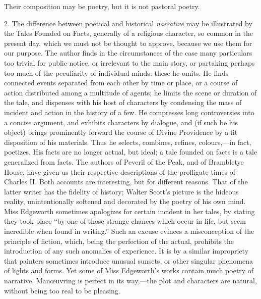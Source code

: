 Their composition may be poetry, but it is not pastoral poetry.

2. The difference between poetical and historical \emph{narrative}
may be illustrated by the Tales Founded on Facts, generally of a
religious character, so common in the present day, which we must not
be thought to approve, because we use them for our purpose. The author
finds in the circumstances of the case many particulars too trivial
for public notice, or irrelevant to the main story, or partaking
perhaps too much of the peculiarity of individual minds: these he
omits. He finds connected events separated from each other by time or
place, or a course of action distributed among a multitude of agents;
he limits the scene or duration of the tale, and dispenses with his
host of characters by condensing the mass of incident and action in
the history of a few. He compresses long controversies into a concise
argument, and exhibits characters by dialogue, and (if such be his
object) brings prominently forward the course of Divine Providence by
a fit disposition of his materials. Thus he selects, combines,
refines, colours,—in fact, poetizes. His facts are no longer actual,
but ideal; a tale founded on facts is a tale generalized from facts.
The authors of Peveril of the Peak, and of Brambletye House, have
given us their respective descriptions of the profligate times of
Charles II. Both accounts are interesting, but for different reasons.
That of the latter writer has the fidelity of history; Walter Scott's
picture is the hideous reality, unintentionally softened and decorated
by the poetry of his own mind. Miss Edgeworth sometimes apologizes for
certain incident in her tales, by stating they took place
``by one of those strange chances which occur in life, but seem
incredible when found in writing.'' Such an excuse evinces a
misconception of the principle of fiction, which, being the perfection
of the actual, prohibits the introduction of any such anomalies of
experience. It is by a similar impropriety that painters sometimes
introduce unusual sunsets, or other singular phenomena of lights and
forms. Yet some of Miss Edgeworth's works contain much poetry of
narrative. Manœuvring is perfect in its way,—the plot and
characters are natural, without being too real to be pleasing.

